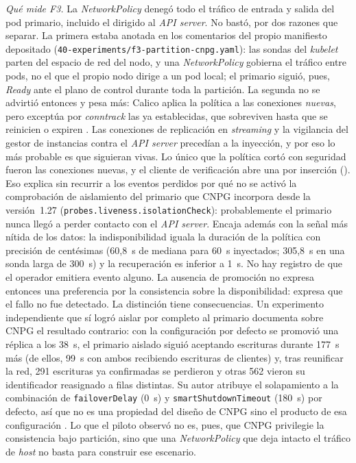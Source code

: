 \textit{Qué mide F3.} La \textit{NetworkPolicy} denegó todo el tráfico de entrada y salida del pod primario, incluido el dirigido al \textit{API server}. No bastó, por dos razones que separar. La primera estaba anotada en los comentarios del propio manifiesto depositado (\texttt{40-experiments/\allowbreak f3-partition-\allowbreak cnpg.yaml}): las sondas del \textit{kubelet} parten del espacio de red del nodo, y una \textit{NetworkPolicy} gobierna el tráfico entre pods, no el que el propio nodo dirige a un pod local; el primario siguió, pues, \textit{Ready} ante el plano de control durante toda la partición. La segunda no se advirtió entonces y pesa más: Calico aplica la política a las conexiones \emph{nuevas}, pero exceptúa por \textit{conntrack} las ya establecidas, que sobreviven hasta que se reinicien o expiren  \citep{calico2026}. Las conexiones de replicación en \textit{streaming} y la vigilancia del gestor de instancias contra el \textit{API server} precedían a la inyección, y por eso lo más probable es que siguieran vivas. Lo único que la política cortó con seguridad fueron las conexiones nuevas, y el cliente de verificación abre una por inserción (). Eso explica sin recurrir a los eventos perdidos por qué no se activó la comprobación de aislamiento del primario que CNPG incorpora desde la versión~1.27 (\texttt{probes.liveness.\allowbreak isolationCheck}): probablemente el primario nunca llegó a perder contacto con el \textit{API server}. Encaja además con la señal más nítida de los datos: la indisponibilidad iguala la duración de la política con precisión de centésimas  (60,8~s de mediana para 60~s inyectados; 305,8~s en una sonda larga de 300~s) y la recuperación es inferior a 1~s. No hay registro de que el operador emitiera evento alguno. La ausencia de promoción no expresa entonces una preferencia por la consistencia sobre la disponibilidad: expresa que el fallo no fue detectado. La distinción tiene consecuencias. Un experimento independiente que sí logró aislar por completo al primario documenta sobre CNPG el resultado contrario: con la configuración por defecto se promovió una réplica a los 38~s, el primario aislado siguió aceptando escrituras durante 177~s más  (de ellos, 99~s con ambos recibiendo escrituras de clientes) y, tras reunificar la red, 291 escrituras ya confirmadas se perdieron y otras 562 vieron su identificador reasignado a filas distintas. Su autor atribuye el solapamiento a la combinación de \texttt{failoverDelay} (0~s) y \texttt{smartShutdownTimeout} (180~s) por defecto, así que no es una propiedad del diseño de CNPG sino el producto de esa configuración \citep{sivko2026}. Lo que el piloto observó no es, pues, que CNPG privilegie la consistencia bajo partición, sino que una \textit{NetworkPolicy} que deja intacto el tráfico de \textit{host} no basta para construir ese escenario.

